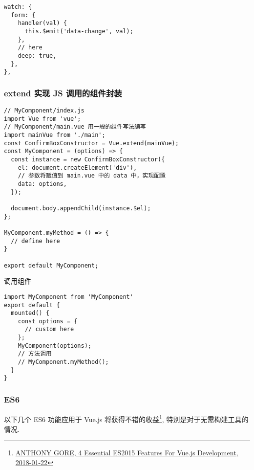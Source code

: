 \begin{lstlisting}
watch: {
  form: {
    handler(val) {
      this.$emit('data-change', val);
    },
    // here
    deep: true,
  },
},
\end{lstlisting}

\subsubsection{extend 实现 JS
调用的组件封装}\label{extend-ux5b9eux73b0-js-ux8c03ux7528ux7684ux7ec4ux4ef6ux5c01ux88c5}

\begin{lstlisting}
// MyComponent/index.js
import Vue from 'vue';
// MyComponent/main.vue 用一般的组件写法编写
import mainVue from './main';
const ConfirmBoxConstructor = Vue.extend(mainVue);
const MyComponent = (options) => {
  const instance = new ConfirmBoxConstructor({
    el: document.createElement('div'),
    // 参数将赋值到 main.vue 中的 data 中，实现配置
    data: options,
  });

  document.body.appendChild(instance.$el);
};

MyComponent.myMethod = () => {
  // define here
}

export default MyComponent;
\end{lstlisting}

调用组件

\begin{lstlisting}
import MyComponent from 'MyComponent'
export default {
  mounted() {
    const options = {
      // custom here
    };
    MyComponent(options);
    // 方法调用
    // MyComponent.myMethod();
  }
}
\end{lstlisting}

\subsubsection{ES6}\label{es6}

以下几个 ES6 功能应用于 Vue.js 将获得不错的收益\footnote{\href{https://vuejsdevelopers.com/2018/01/22/vue-js-javascript-es6/}{ANTHONY
  GORE, 4 Essential ES2015 Features For Vue.js Development, 2018-01-22}},
特别是对于无需构建工具的情况.


